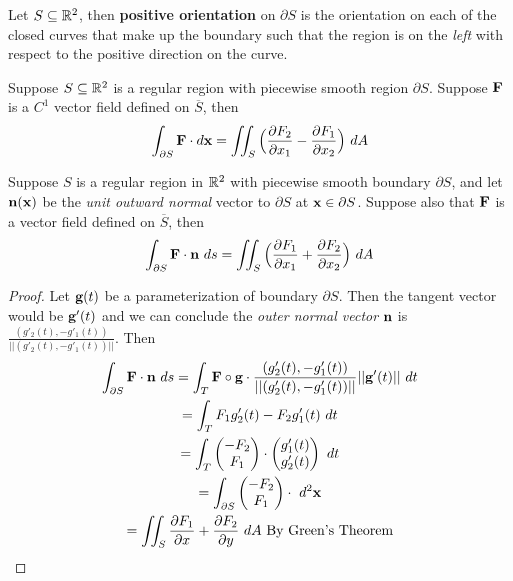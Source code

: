 \documentclass[11pt]{article}
\begin{document}
				\begin{definition}
					Let $S \subseteq \mathbb{R}^2$, then \textbf{positive orientation} on $\partial S$ is the orientation on each of the closed curves that make up the boundary such that the region is on the \emph{left} with respect to the positive direction on the curve.
				\end{definition}
				
				\begin{theorem}
					Suppose $S \subseteq \mathbb{R}^2$ is a regular region with piecewise smooth region $\partial S$. Suppose $\textbf{F}$ is a $C^1$ vector field defined on $\overline{S}$, then
					\begin{equation}
						\int_{\partial S} \textbf{F}\cdot d\textbf{x} = \iint_S \Big(\frac{\partial{F_2}}{\partial{x_1}} - \frac{\partial{F_1}}{\partial{x_2}}\Big)\ dA
					\end{equation}
				\end{theorem}
				
				\begin{corollary}
					Suppose $S$ is a regular region in $\mathbb{R}^2$ with piecewise smooth boundary $\partial S$, and let $\textbf{n}(\textbf{x})$ be the \emph{unit outward normal} vector to $\partial S$ at $\textbf{x} \in \partial S$. Suppose also that $\textbf{F}$ is a vector field defined on $\overline{S}$, then
					\begin{equation}
						\int_{\partial S} \ve{F} \cdot \ve{n}\ ds = \iint_S \Big(\pd{F_1}{x_1}  + \pd{F_2}{x_2}\Big)\ dA
					\end{equation}
						\begin{proof}
							Let $\textbf{g}(t)$ be a parameterization of boundary $\partial S$. Then the tangent vector would be $\textbf{g}'(t)$ and we can conclude the \emph{outer normal vector} $\textbf{n}$ is $\frac{(g'_2(t), -g'_1(t))}{||(g'_2(t), - g'_1(t))||}$. Then 
							\begin{gather}
								\int_{\partial S}\ve{F} \cdot \ve{n}\ ds = \int_{T}\ve{F}\circ \ve{g} \cdot \frac{(g'_2(t), -g'_1(t))}{||(g'_2(t), -g'_1(t))||} ||\ve{g}'(t)||\ dt \\
								=  \int_T F_1 g'_2(t) - F_2 g'_1(t)\ dt \\
								= \int_T \begin{pmatrix}-F_2 \\F_1 \end{pmatrix} \cdot \begin{pmatrix} g'_1(t) \\ g'_2(t) \end{pmatrix}\ dt \\
								= \int_{\partial S} \begin{pmatrix}-F_2 \\F_1 \end{pmatrix} \cdot\ d^2\ve{x} \\
								= \iint_{S} \pd{F_1}{x} + \pd{F_2}{y}\ dA \tx{ By Green's Theorem}
							\end{gather}
						\end{proof}
				\end{corollary}
\end{document}
